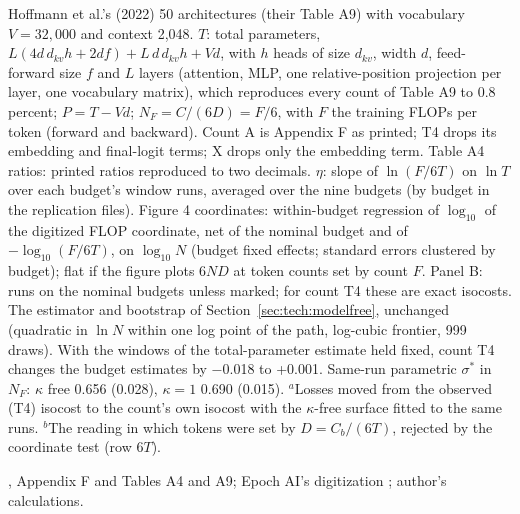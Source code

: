 \begin{table}[tp]
\begin{tablenotes}
Hoffmann et al.'s (2022) 50 architectures (their Table A9) with vocabulary $V=32{,}000$ and context 2,048. $T$: total parameters, $L(4d\,d_{kv}h+2df)+L\,d\,d_{kv}h+Vd$, with $h$ heads of size $d_{kv}$, width $d$, feed-forward size $f$ and $L$ layers (attention, MLP, one relative-position projection per layer, one vocabulary matrix), which reproduces every count of Table A9 to 0.8 percent; $P=T-Vd$; $N_F=C/(6D)=F/6$, with $F$ the training FLOPs per token (forward and backward). Count A is Appendix F as printed; T4 drops its embedding and final-logit terms; X drops only the embedding term. Table A4 ratios: printed ratios reproduced to two decimals. $\eta$: slope of $\ln(F/6T)$ on $\ln T$ over each budget's window runs, averaged over the nine budgets (by budget in the replication files). Figure 4 coordinates: within-budget regression of $\log_{10}$ of the digitized FLOP coordinate, net of the nominal budget and of $-\log_{10}(F/6T)$, on $\log_{10}N$ (budget fixed effects; standard errors clustered by budget); flat if the figure plots $6ND$ at token counts set by count $F$. Panel B: runs on the nominal budgets unless marked; for count T4 these are exact isocosts. The estimator and bootstrap of Section~\ref{sec:tech:modelfree}, unchanged (quadratic in $\ln N$ within one log point of the path, log-cubic frontier, 999 draws). With the windows of the total-parameter estimate held fixed, count T4 changes the budget estimates by $-$0.018 to +0.001. Same-run parametric $\sigma^*$ in $N_F$: $\kappa$ free 0.656 (0.028), $\kappa=1$ 0.690 (0.015). $^{a}$Losses moved from the observed (T4) isocost to the count's own isocost with the $\kappa$-free surface fitted to the same runs. $^{b}$The reading in which tokens were set by $D=C_b/(6T)$, rejected by the coordinate test (row $6T$).
\end{tablenotes}

\begin{tablenotes}[Source]
\citet{hoffmann2022training}, Appendix F and Tables A4 and A9; Epoch AI's digitization \citep{besiroglu2024chinchilla}; author's calculations.
\end{tablenotes}
\end{table}

